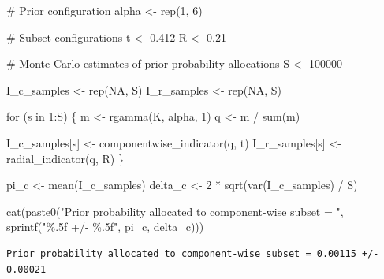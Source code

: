 \documentclass[
  letterpaper,
  DIV=11,
  numbers=noendperiod]{scrartcl}
\newenvironment{Shaded}{\begin{snugshade}}{\end{snugshade}}
\newcommand{\CommentTok}[1]{\textcolor[rgb]{0.37,0.37,0.37}{#1}}
\newcommand{\ConstantTok}[1]{\textcolor[rgb]{0.56,0.35,0.01}{#1}}
\newcommand{\ControlFlowTok}[1]{\textcolor[rgb]{0.00,0.23,0.31}{#1}}
\newcommand{\DecValTok}[1]{\textcolor[rgb]{0.68,0.00,0.00}{#1}}
\newcommand{\FloatTok}[1]{\textcolor[rgb]{0.68,0.00,0.00}{#1}}
\newcommand{\FunctionTok}[1]{\textcolor[rgb]{0.28,0.35,0.67}{#1}}
\newcommand{\NormalTok}[1]{\textcolor[rgb]{0.00,0.23,0.31}{#1}}
\newcommand{\OtherTok}[1]{\textcolor[rgb]{0.00,0.23,0.31}{#1}}
\newcommand{\SpecialCharTok}[1]{\textcolor[rgb]{0.37,0.37,0.37}{#1}}
\newcommand{\StringTok}[1]{\textcolor[rgb]{0.13,0.47,0.30}{#1}}
\begin{document}
\begin{Shaded}
\begin{Highlighting}[]
\CommentTok{\# Prior configuration}
\NormalTok{alpha }\OtherTok{\textless{}{-}} \FunctionTok{rep}\NormalTok{(}\DecValTok{1}\NormalTok{, }\DecValTok{6}\NormalTok{)}

\CommentTok{\# Subset configurations}
\NormalTok{t }\OtherTok{\textless{}{-}} \FloatTok{0.412}
\NormalTok{R }\OtherTok{\textless{}{-}} \FloatTok{0.21}

\CommentTok{\# Monte Carlo estimates of prior probability allocations}
\NormalTok{S }\OtherTok{\textless{}{-}} \DecValTok{100000}

\NormalTok{I\_c\_samples }\OtherTok{\textless{}{-}} \FunctionTok{rep}\NormalTok{(}\ConstantTok{NA}\NormalTok{, S)}
\NormalTok{I\_r\_samples }\OtherTok{\textless{}{-}} \FunctionTok{rep}\NormalTok{(}\ConstantTok{NA}\NormalTok{, S)}

\ControlFlowTok{for}\NormalTok{ (s }\ControlFlowTok{in} \DecValTok{1}\SpecialCharTok{:}\NormalTok{S) \{}
\NormalTok{  m }\OtherTok{\textless{}{-}} \FunctionTok{rgamma}\NormalTok{(K, alpha, }\DecValTok{1}\NormalTok{)}
\NormalTok{  q }\OtherTok{\textless{}{-}}\NormalTok{ m }\SpecialCharTok{/} \FunctionTok{sum}\NormalTok{(m)}

\NormalTok{  I\_c\_samples[s] }\OtherTok{\textless{}{-}} \FunctionTok{componentwise\_indicator}\NormalTok{(q, t)}
\NormalTok{  I\_r\_samples[s] }\OtherTok{\textless{}{-}} \FunctionTok{radial\_indicator}\NormalTok{(q, R)}
\NormalTok{\}}
\end{Highlighting}
\end{Shaded}

\begin{Shaded}
\begin{Highlighting}[]
\NormalTok{pi\_c }\OtherTok{\textless{}{-}} \FunctionTok{mean}\NormalTok{(I\_c\_samples)}
\NormalTok{delta\_c }\OtherTok{\textless{}{-}} \DecValTok{2} \SpecialCharTok{*} \FunctionTok{sqrt}\NormalTok{(}\FunctionTok{var}\NormalTok{(I\_c\_samples) }\SpecialCharTok{/}\NormalTok{ S)}

\FunctionTok{cat}\NormalTok{(}\FunctionTok{paste0}\NormalTok{(}\StringTok{"Prior probability allocated to component{-}wise subset = "}\NormalTok{,}
           \FunctionTok{sprintf}\NormalTok{(}\StringTok{"\%.5f +/{-} \%.5f"}\NormalTok{, pi\_c, delta\_c)))}
\end{Highlighting}
\end{Shaded}

\begin{verbatim}
Prior probability allocated to component-wise subset = 0.00115 +/- 0.00021
\end{verbatim}
\end{document}
